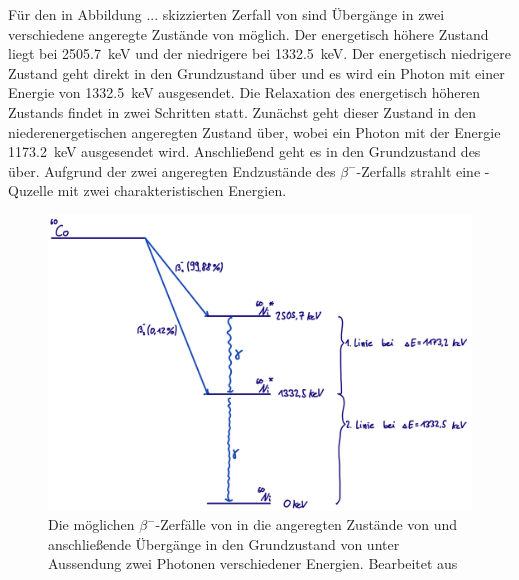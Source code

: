         \FloatBarrier
        
        Für den in Abbildung ... skizzierten Zerfall von  sind Übergänge in zwei verschiedene angeregte Zustände von  möglich. Der energetisch höhere Zustand liegt bei 
        \SI{2505.7}{\kilo\electronvolt} und der niedrigere bei \SI{1332.5}{\kilo\electronvolt}. Der energetisch niedrigere Zustand geht direkt in den Grundzustand über und es wird ein Photon mit einer Energie
        von \SI{1332.5}{\kilo\electronvolt} ausgesendet. Die Relaxation des energetisch höheren Zustands findet in zwei Schritten statt. Zunächst geht dieser Zustand in den niederenergetischen angeregten Zustand 
        über, wobei ein Photon mit der Energie \SI{1173.2}{\kilo\electronvolt} ausgesendet wird. Anschließend geht es in den Grundzustand des  über. Aufgrund der zwei angeregten Endzustände des 
        $\beta^-$-Zerfalls strahlt eine -Quzelle mit zwei charakteristischen Energien.

        \FloatBarrier

        \begin{figure}[h]
          \centering
          \includegraphics[width = 1\textwidth]{pictures/co.png}
          \caption{Die möglichen $\beta^-$-Zerfälle von  in die angeregten Zustände von  und anschließende Übergänge in den Grundzustand von  unter Aussendung zwei Photonen verschiedener Energien. Bearbeitet aus }
          \label{fig:co_schema}
        \end{figure}
    
        \FloatBarrier

